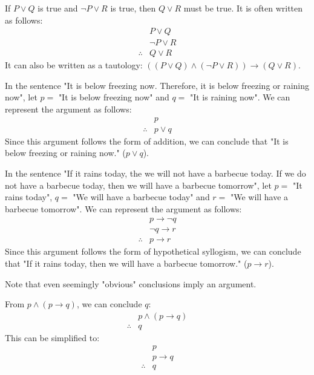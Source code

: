\begin{definition}[Resolution]
    If $P \lor Q$ is true and $\neg P \lor R$ is true, then $Q \lor R$ must be true. It is often written as follows:
    \[
        \begin{array}{rl}
            & P \lor Q \\
            & \neg P \lor R \\
            \hline
            \therefore & Q \lor R
        \end{array}
    \]
    It can also be written as a tautology: $((P \lor Q) \land (\neg P \lor R)) \to (Q \lor R)$.
\end{definition}

\begin{eg}
    In the sentence "It is below freezing now. Therefore, it is below freezing or raining now", let $p =$ "It is below freezing now" and $q =$ "It is raining now". We can represent the argument as follows:
    \[
        \begin{array}{rl}
            & p \\
            \hline
            \therefore & p \lor q
        \end{array}
    \]
    Since this argument follows the form of addition, we can conclude that "It is below freezing or raining now." ($p \lor q$).
\end{eg}

\begin{eg}
    In the sentence "If it rains today, the we will not have a barbecue today. If we do not have a barbecue today, then we will have a barbecue tomorrow", let $p =$ "It rains today", $q =$ "We will have a barbecue today" and $r =$ "We will have a barbecue tomorrow". We can represent the argument as follows:
    \[
        \begin{array}{rl}
            & p \to \neg q \\
            & \neg q \to r \\
            \hline
            \therefore & p \to r
        \end{array}
    \]
    Since this argument follows the form of hypothetical syllogism, we can conclude that "If it rains today, then we will have a barbecue tomorrow." ($p \to r$).
\end{eg}
Note that even seemingly "obvious" conclusions imply an argument.
\begin{eg}
    From $p \land (p \to q)$, we can conclude $q$:
    \[
        \begin{array}{rl}
            & p \land (p \to q) \\
            \hline
            \therefore & q
        \end{array}
    \]
    This can be simplified to:
    \[
        \begin{array}{rl}
            & p \\
            & p \to q \\
            \hline
            \therefore & q
        \end{array}
    \]
\end{eg}

